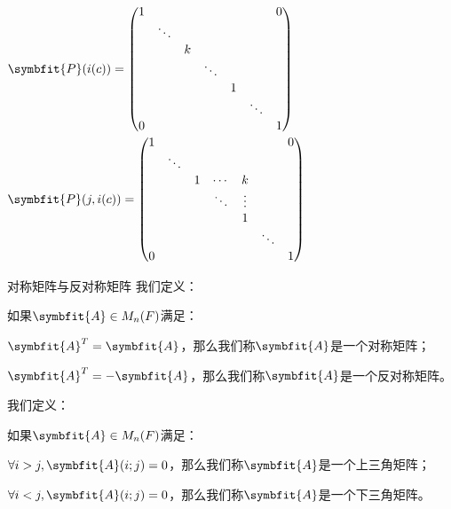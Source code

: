 \documentclass[12pt, a4paper, oneside, UTF8]{ctexbook}
\begin{document}
\begin{para}{0}
				$\symbfit{P}(i(c))=\begin{pmatrix}
					1      &        &        &        &        &        & 0       \\
						& \ddots &        &        &        &        &        \\
						&        & k      &        &        &        &        \\
						&        &        & \ddots &        &        &        \\
						&        &        &        & 1      &        &        \\
						&        &        &        &        & \ddots &        \\
					0	&        &        &        &        &        & 1
					\end{pmatrix}$
				$\symbfit{P}(j,i(c))=\begin{pmatrix}
					1      &        &        &        &        &        &  0      \\
						& \ddots &        &        &        &        &        \\
						&        & 1      & \cdots & k      &        &        \\
						&        &        & \ddots & \vdots &        &        \\
						&        &        &        & 1      &        &        \\
						&        &        &        &        & \ddots &        \\
					0	&        &        &        &        &        & 1
					\end{pmatrix}$
				\begin{defn}{对称矩阵与反对称矩阵}{}
					我们定义：
					
					如果$\symbfit{A} \in M_n(F)$满足：

					$\symbfit{A}^T = \symbfit{A}$，那么我们称$\symbfit{A}$是一个对称矩阵；

					$\symbfit{A}^T = -\symbfit{A}$，那么我们称$\symbfit{A}$是一个反对称矩阵。
				\end{defn}
				\begin{defn}
					我们定义：
					
					如果$\symbfit{A} \in M_n(F)$满足：

					$\forall i>j,\symbfit{A}(i;j)=0$，那么我们称$\symbfit{A}$是一个上三角矩阵；

					$\forall i<j,\symbfit{A}(i;j)=0$，那么我们称$\symbfit{A}$是一个下三角矩阵。
				\end{defn}
		\end{para}
\end{document}

